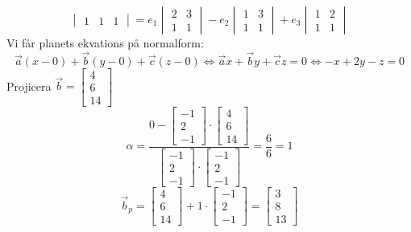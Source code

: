 \begin{Ex}
\[\begin{vmatrix}
        1 & 1 & 1
    \end{vmatrix}
    = e_1
    \begin{vmatrix}
        2 & 3\\
        1 & 1
    \end{vmatrix}
     - e_2
     \begin{vmatrix}
         1 & 3\\
         1 & 1
     \end{vmatrix}
     + e_3
     \begin{vmatrix}
         1 & 2\\
         1 & 1
     \end{vmatrix}
    \]
    Vi får planets ekvations på normalform:
    \[
        \vec{a}(x -0) + \vec{b}(y -0) + \vec{c}(z -0) \Leftrightarrow \vec{a}x + \vec{b}y + \vec{c}z = 0 \Leftrightarrow -x + 2y -z = 0
    \]
    Projicera $\vec{b} = \begin{bmatrix} 4\\6\\14 \end{bmatrix}$
    \[
        \alpha = \frac{0 - \begin{bmatrix} -1\\2\\-1 \end{bmatrix} \cdot \begin{bmatrix} 4\\6\\14 \end{bmatrix}}{\begin{bmatrix} -1\\2\\-1 \end{bmatrix} \cdot \begin{bmatrix} -1\\2\\-1 \end{bmatrix}} = \frac{6}{6} = 1
    \]
    \[
        \vec{b}_p = \begin{bmatrix} 4\\6\\14 \end{bmatrix} + 1 \cdot \begin{bmatrix} -1\\2\\-1 \end{bmatrix} = \begin{bmatrix} 3\\8\\13 \end{bmatrix}
\]
\end{Ex}
